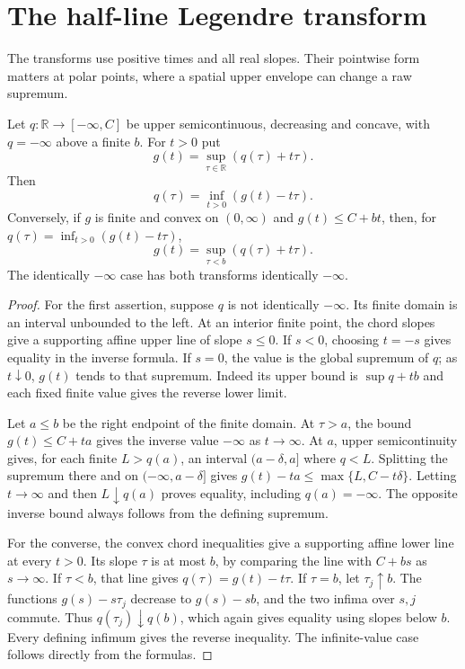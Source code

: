 \section{The half-line Legendre transform}
\label{sec:half-line-legendre-duality}
The transforms use positive times and all real slopes. Their pointwise form matters at polar points, where a spatial upper envelope can change a raw supremum.

\begin{lemma}\label{lem:half-line-scalar-legendre-duality}
Let $q:\mathbb R\to[-\infty,C]$ be upper semicontinuous, decreasing and concave, with $q=-\infty$ above a finite $b$. For $t>0$ put
\[
 g(t)=\sup_{\tau\in\mathbb R}(q(\tau)+t\tau).
\]
Then
\[
 q(\tau)=\inf_{t>0}(g(t)-t\tau).
\]
Conversely, if $g$ is finite and convex on $(0,\infty)$ and $g(t)\leq C+bt$, then, for $q(\tau)=\inf_{t>0}(g(t)-t\tau)$,
\[
 g(t)=\sup_{\tau<b}(q(\tau)+t\tau).
\]
The identically $-\infty$ case has both transforms identically $-\infty$.
\end{lemma}
\begin{proof}
For the first assertion, suppose $q$ is not identically $-\infty$. Its finite domain is an interval unbounded to the left. At an interior finite point, the chord slopes give a supporting affine upper line of slope $s\leq0$. If $s<0$, choosing $t=-s$ gives equality in the inverse formula. If $s=0$, the value is the global supremum of $q$; as $t\downarrow0$, $g(t)$ tends to that supremum. Indeed its upper bound is $\sup q+tb$ and each fixed finite value gives the reverse lower limit.

Let $a\leq b$ be the right endpoint of the finite domain. At $\tau>a$, the bound $g(t)\leq C+ta$ gives the inverse value $-\infty$ as $t\to\infty$. At $a$, upper semicontinuity gives, for each finite $L>q(a)$, an interval $(a-\delta,a]$ where $q<L$. Splitting the supremum there and on $(-\infty,a-\delta]$ gives
$g(t)-ta\leq\max\{L,C-t\delta\}$.
Letting $t\to\infty$ and then $L\downarrow q(a)$ proves equality, including $q(a)=-\infty$. The opposite inverse bound always follows from the defining supremum.

For the converse, the convex chord inequalities give a supporting affine lower line at every $t>0$. Its slope $\tau$ is at most $b$, by comparing the line with $C+bs$ as $s\to\infty$. If $\tau<b$, that line gives $q(\tau)=g(t)-t\tau$. If $\tau=b$, let $\tau_j\uparrow b$. The functions $g(s)-s\tau_j$ decrease to $g(s)-sb$, and the two infima over $s,j$ commute. Thus $q(\tau_j)\downarrow q(b)$, which again gives equality using slopes below $b$. Every defining infimum gives the reverse inequality. The infinite-value case follows directly from the formulas.
\end{proof}


